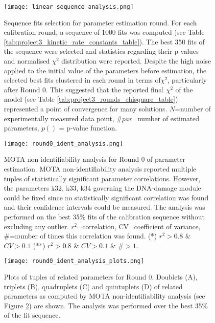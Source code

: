 \begin{figure}[tb]
	\begin{center}
		\texttt{[image: linear\_sequence\_analysis.png]}
		\caption[Sequence fits selection for parameter estimation round]{Sequence fits selection for parameter estimation round. For each calibration round, a sequence of 1000 fits was computed (see Table \ref{tab:project3_kinetic_rate_constants_table}). The best 350 fits of the sequence were selected and statistics regarding their p-values and normalised $\chi^2$ distribution were reported. Despite the high noise applied to the initial value of the parameters before estimation, the selected best fits clustered in each round in terms of$\chi^2$, particularly after Round 0. This suggested that the reported final $\chi^2$ of the model (see Table \ref{tab:project3_rounds_chisquare_table}) represented a point of convergence for many solutions. $N$=number of experimentally measured data point, $\#par$=number of estimated parameters, $p()$ = p-value function. }
		\label{fig:project3_linear_sequence_analysis}
	\end{center}
\end{figure}
\clearpage

\begin{figure}[tb]
	\begin{center}
		\texttt{[image: round0\_ident\_analysis.png]}
		\caption[MOTA non-identifiability analysis for Round 0 of parameter estimation]{MOTA non-identifiability analysis for Round 0 of parameter estimation. MOTA non-identifiability analysis reported multiple tuples of statistically significant parameter correlations. However, the parameters k32, k33, k34 governing the DNA-damage module could be fixed since no statistically significant correlation was found and their confidence intervals could be measured. The analysis was performed on the best 35\% fits of the calibration sequence without excluding any outlier. $r^2$=correlation, CV=coefficient of variance, \#=number of times this correlation was found. (*) $r^2 > 0.8$ \& $CV > 0.1$  (**) $r^2 > 0.8$ \& $CV > 0.1$ \& \#$> 1$.}
		\label{fig:project3_round0_ident_analysis}
	\end{center}
\end{figure}
\clearpage

\begin{figure}[tb]
	\begin{center}
		\texttt{[image: round0\_ident\_analysis\_plots.png]}
		\caption[Plots of tuples of related parameters for Round 0]{Plots of tuples of related parameters for Round 0. Doublets (A), triplets (B), quadruplets (C) and quintuplets (D) of related parameters as computed by MOTA non-identifiability analysis (see Figure \ref{fig:project3_round0_ident_analysis}) are shown. The analysis was performed over the best 35\% of the fit sequence.}
		\label{fig:project3_round0_ident_analysis_plots}
	\end{center}
\end{figure}
\clearpage

